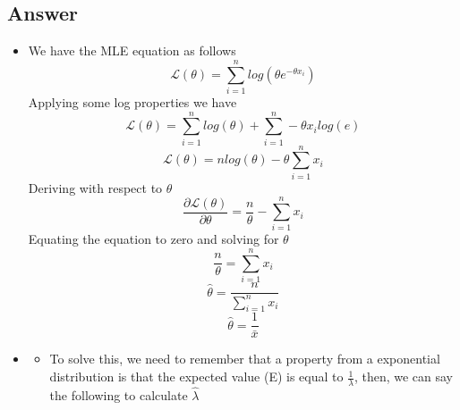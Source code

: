 \documentclass[conference, onecolumn]{IEEEtran}
\begin{document}
	\subsection*{Answer}
	\begin{itemize}
		\item [\textbf{(a)}]
		We have the MLE equation as follows
		\begin{equation}
			\mathcal{L} (\theta) = \sum_{i=1}^{n} log(\theta e^{-\theta x_i})
		\end{equation}
		Applying some log properties we have
		\begin{equation}
			\mathcal{L} (\theta) = \sum_{i=1}^{n} log(\theta) + \sum_{i=1}^{n} -\theta x_i log(e)
		\end{equation}
		\begin{equation}
			\mathcal{L} (\theta) = n log(\theta) - \theta\sum_{i=1}^{n} x_i
		\end{equation}
		Deriving with respect to $\theta$
		\begin{equation}
			\frac{\partial\mathcal{L}(\theta)}{\partial\theta} = \frac{n}{\theta} - \sum_{i=1}^{n} x_i
		\end{equation}
		Equating the equation to zero and solving for $\theta$
		\begin{equation}
			\frac{n}{\theta} = \sum_{i=1}^{n} x_i
		\end{equation}
		\begin{equation}
			\hat{\theta} = \frac{n}{\sum_{i=1}^{n} x_i}
		\end{equation}
		\begin{equation}
			\hat{\theta} = \frac{1}{\bar{x}}
		\end{equation}
		\item [\textbf{(b)}]
		\begin{itemize}
			\item [i.] To solve this, we need to remember that a property from a exponential distribution is that the expected value (E) is equal to $\frac{1}{\lambda}$, then, we can say the following to calculate $\hat{\lambda}$
			

\end{itemize}
\end{itemize}
\end{document}
